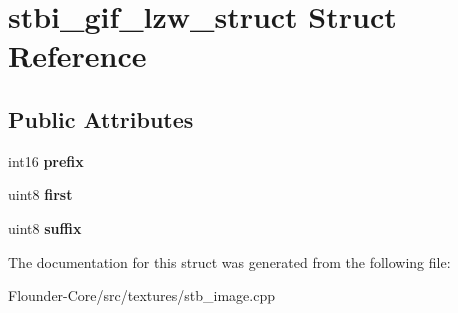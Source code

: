\hypertarget{structstbi__gif__lzw__struct}{}\section{stbi\+\_\+gif\+\_\+lzw\+\_\+struct Struct Reference}
\label{structstbi__gif__lzw__struct}
\subsection*{Public Attributes}
\begin{DoxyCompactItemize}
\item 
\mbox{\label{structstbi__gif__lzw__struct_a0e5142cb4117b905eb9efd73c436525c}} 
int16 {\bfseries prefix}
\item 
\mbox{\label{structstbi__gif__lzw__struct_a08129c445d56c0983285d6e0e71b83bd}} 
uint8 {\bfseries first}
\item 
\mbox{\label{structstbi__gif__lzw__struct_a3ec7f462268018489345b79b2f123764}} 
uint8 {\bfseries suffix}
\end{DoxyCompactItemize}


The documentation for this struct was generated from the following file\+:\begin{DoxyCompactItemize}
\item 
Flounder-\/\+Core/src/textures/stb\+\_\+image.\+cpp\end{DoxyCompactItemize}
